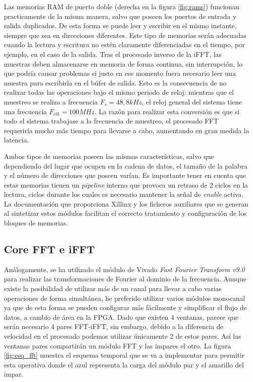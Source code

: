 Las memorias RAM de puerto doble (derecha en la figura \ref{fig:rams}) funcionan practicamente de la misma manera, salvo que poseen los puertos de entrada y salida duplicados. De esta forma se puede leer y escribir en el mismo instante, siempre que sea en direcciones diferentes. Este tipo de memorias serán adecuadas cuando la lectura y escritura no estén claramente diferenciadas en el tiempo, por ejemplo, en el caso de la salida. Tras el procesado inverso de la iFFT, las muestras deben almacenarse en memoria de forma continua, sin interrupción, lo que podría causar problemas si justo en ese momento fuera necesario leer una muestra para escribirla en el búfer de salida. Esto es la consecuencia de no realizar todas las operaciones bajo el mismo periodo de reloj: mientras que el muestreo se realiza a frecuencia $F_{s}=48,8kHz$, el reloj general del sistema tiene una frecuencia $F_{clk} = 100MHz$. La razón para realizar esta conversión es que si todo el sistema trabajase a la frecuencia de muestreo, el procesado FFT requeriría mucho más tiempo para llevarse a cabo, aumentando en gran medida la latencia. 

Ambos tipos de memorias poseen las mismas características, salvo que dependiendo del lugar que ocupen en la cadena de datos, el tamaño de la palabra y el número de direcciones que poseen varían. Es importante tener en cuenta que estas memorias tienen un \emph{pipeline} interno que provoca un retraso de 2 ciclos en la lectura, ciclos durante los cuales es necesario mantener la señal de \emph{enable} activa. La documentación que proporciona Xillinx y los ficheros auxiliares que se generan al sintetizar estos módulos facilitan el correcto tratamiento y configuración de los bloques de memorias.

\subsection{Core FFT e iFFT}
Análogamente, se ha utilizado el módulo de Vivado \emph{Fast Fourier Transform v9.0}~\cite{fftdoc} para realizar las transformaciones de Fourier al dominio de la frecuencia. Aunque existe la posibilidad de utilizar más de un canal para llevar a cabo varias operaciones de forma simultánea, he preferido utilizar varios módulos monocanal ya que de esta forma se pueden configurar más fácilmente y simplificar el flujo de datos, a cambio de área en la FPGA. Dado que existen 4 ventanas, parece que serán necesario 4 pares FFT-iFFT, sin embargo, debido a la diferencia de velocidad en el procesado podemos utilizar únicamente 2 de estos pares. Así las ventanas pares compartirán un módulo FFT y las impares el otro. La figura \ref{fig:esq_fft} muestra el esquema temporal que se va a implementar para permitir esta operativa donde el azul representa la carga del módulo par y el amarillo del impar.
 
